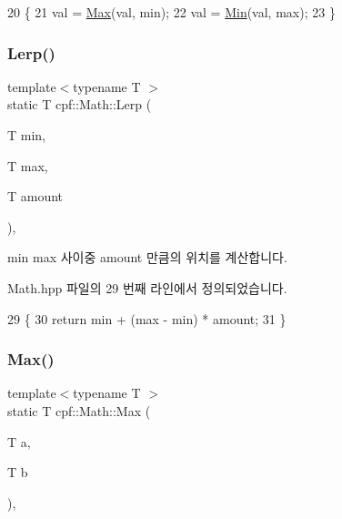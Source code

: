 \begin{DoxyCode}
20                                             \{
21             val = \hyperlink{classcpf_1_1_math_aabd6b0e775e2a0e6eea07ab9be0bf60e}{Max}(val, min);
22             val = \hyperlink{classcpf_1_1_math_a182737f1c3c7268808951fffb3287293}{Min}(val, max);
23         \}
\end{DoxyCode}
\mbox{\label{classcpf_1_1_math_a33cf05f577c2f756b37478de7a6817bb}} 
\subsubsection{\texorpdfstring{Lerp()}{Lerp()}}
{\footnotesize\ttfamily template$<$typename T $>$ \\
static T cpf\+::\+Math\+::\+Lerp (\begin{DoxyParamCaption}\item[{T}]{min,  }\item[{T}]{max,  }\item[{T}]{amount }\end{DoxyParamCaption})\hspace{0.3cm}{\ttfamily [inline]}, {\ttfamily [static]}}

min max 사이중 amount 만큼의 위치를 계산합니다. 

Math.\+hpp 파일의 29 번째 라인에서 정의되었습니다.


\begin{DoxyCode}
29                                               \{
30             \textcolor{keywordflow}{return} min + (max - min) * amount;
31         \}
\end{DoxyCode}
\mbox{\label{classcpf_1_1_math_aabd6b0e775e2a0e6eea07ab9be0bf60e}} 
\subsubsection{\texorpdfstring{Max()}{Max()}}
{\footnotesize\ttfamily template$<$typename T $>$ \\
static T cpf\+::\+Math\+::\+Max (\begin{DoxyParamCaption}\item[{T}]{a,  }\item[{T}]{b }\end{DoxyParamCaption})\hspace{0.3cm}{\ttfamily [inline]}, {\ttfamily [static]}}



